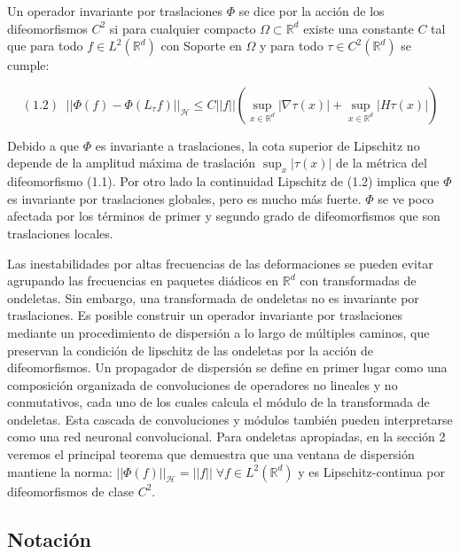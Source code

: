 \begin{definicion}
\noindent Un operador invariante por traslaciones $\Phi$ se dice  por la acción de los difeomorfismos $C^2$  si para cualquier compacto $\Omega \subset \mathbb{R}^d$ existe una constante $C$ tal que para todo $f \in L^2(\mathbb{R}^d)$ con Soporte en $\Omega$ y para todo $\tau \in C^2(\mathbb{R}^d)$ se cumple:

$$(1.2)  \; \; || \Phi(f)-\Phi(L_{\tau}f)||_\mathcal{H} \leq C||f||(\sup_{x \in \mathbb{R}^d} |\nabla \tau (x)| + \sup_{x \in \mathbb{R}^d}|H \tau (x)|)$$

\end{definicion}

\medskip

\noindent Debido a que $\Phi$ es invariante a traslaciones, la cota superior de Lipschitz no depende de la amplitud máxima de traslación $\sup_x|\tau (x)|$ de la métrica del difeomorfismo (1.1). Por otro lado la continuidad Lipschitz de (1.2) implica que $\Phi$ es invariante por traslaciones globales, pero es mucho más fuerte. $\Phi$ se ve poco afectada por los términos de primer y segundo grado de difeomorfismos que son traslaciones locales.

\medskip

\noindent Las inestabilidades por altas frecuencias de las deformaciones se pueden evitar agrupando las frecuencias en paquetes diádicos en $\mathbb{R}^d$ con transformadas de ondeletas. Sin embargo, una transformada de ondeletas no es invariante por traslaciones. Es posible construir un operador invariante por traslaciones mediante un procedimiento de dispersión a lo largo de múltiples caminos, que preservan la condición de lipschitz de las ondeletas por la acción de difeomorfismos. Un propagador de dispersión se define en primer lugar como una composición organizada de convoluciones de operadores no lineales y no conmutativos, cada uno de los cuales calcula el módulo de la transformada de ondeletas. Esta cascada de convoluciones y módulos también pueden interpretarse como una red neuronal convolucional. Para ondeletas apropiadas, en la sección 2 veremos el principal teorema que demuestra que una ventana de dispersión mantiene la norma: $||\Phi(f)||_{\mathcal{H}}=||f|| \; \forall f \in L^2(\mathbb{R}^d)$ y es Lipschitz-continua por difeomorfismos de clase $C^2$.

\subsection{Notación}

